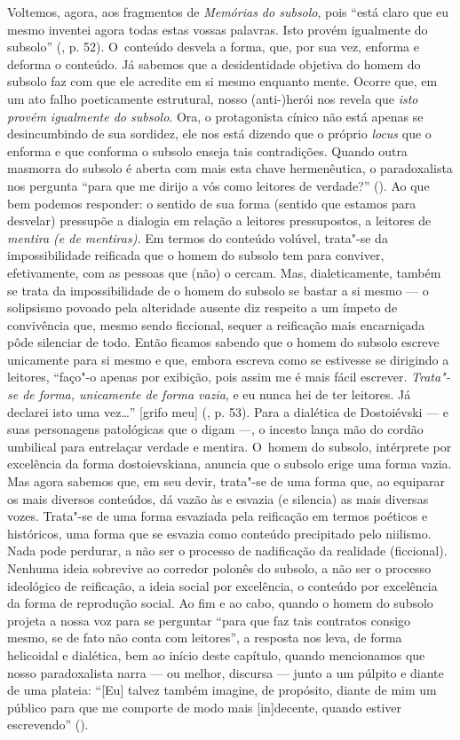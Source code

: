 Voltemos, agora, aos fragmentos de \emph{Memórias do subsolo}, pois
``está claro que eu mesmo inventei agora todas estas vossas palavras.
Isto provém igualmente do subsolo'' (, p. 52). O~conteúdo desvela a
forma, que, por sua vez, enforma e deforma o conteúdo. Já sabemos que a
desidentidade objetiva do homem do subsolo faz com que ele acredite em
si mesmo enquanto mente. Ocorre que, em um ato falho poeticamente
estrutural, nosso \mbox{(anti-)herói} nos revela que \emph{isto provém
igualmente do subsolo}. Ora, o protagonista cínico não está apenas se
desincumbindo de sua sordidez, ele nos está dizendo que o próprio
\emph{locus} que o enforma e que conforma o subsolo enseja tais
contradições. Quando outra masmorra do subsolo é aberta com mais esta
chave hermenêutica, o paradoxalista nos pergunta ``para que me dirijo a
vós como leitores de verdade?'' (). Ao que bem podemos responder:
o sentido de sua forma (sentido que estamos para desvelar) pressupõe a
dialogia em relação a leitores pressupostos, a leitores de \emph{mentira
(e de mentiras).} Em termos do conteúdo volúvel, trata"-se da
impossibilidade reificada que o homem do subsolo tem para conviver,
efetivamente, com as pessoas que (não) o cercam. Mas, dialeticamente,
também se trata da impossibilidade de o homem do subsolo se bastar a si
mesmo --- o solipsismo povoado pela alteridade ausente diz respeito a um
ímpeto de convivência que, mesmo sendo ficcional, sequer a reificação
mais encarniçada pôde silenciar de todo. Então ficamos sabendo que o
homem do subsolo escreve unicamente para si mesmo e que, embora escreva
como se estivesse se dirigindo a leitores, ``faço"-o apenas por exibição,
pois assim me é mais fácil escrever. \emph{Trata"-se de forma, unicamente
de forma vazia}, e eu nunca hei de ter leitores. Já declarei isto uma
vez\ldots'' {[}grifo meu{]} (, p. 53). Para a dialética de Dostoiévski
--- e suas personagens patológicas que o digam ---, o incesto lança mão do
cordão umbilical para entrelaçar verdade e mentira. O~homem do subsolo,
intérprete por excelência da forma dostoievskiana, anuncia que o subsolo
erige uma forma vazia. Mas agora sabemos que, em seu devir, trata"-se de
uma forma que, ao equiparar os mais diversos conteúdos, dá vazão às e
esvazia (e silencia) as mais diversas vozes. Trata"-se de uma forma
esvaziada pela reificação em termos poéticos e históricos, uma forma que
se esvazia como conteúdo precipitado pelo niilismo. Nada pode perdurar,
a não ser o processo de nadificação da realidade (ficcional). Nenhuma
ideia sobrevive ao corredor polonês do subsolo, a não ser o processo
ideológico de reificação, a ideia social por excelência, o conteúdo por
excelência da forma de reprodução social. Ao fim e ao cabo, quando o
homem do subsolo projeta a nossa voz para se perguntar ``para que faz
tais contratos consigo mesmo, se de fato não conta com leitores'', a
resposta nos leva, de forma helicoidal e dialética, bem ao início deste
capítulo, quando mencionamos que nosso paradoxalista narra --- ou melhor,
discursa --- junto a um púlpito e diante de uma plateia: ``{[}Eu{]}
talvez também imagine, de propósito, diante de mim um público para que
me comporte de modo mais {[}in{]}decente, quando estiver escrevendo''
().


